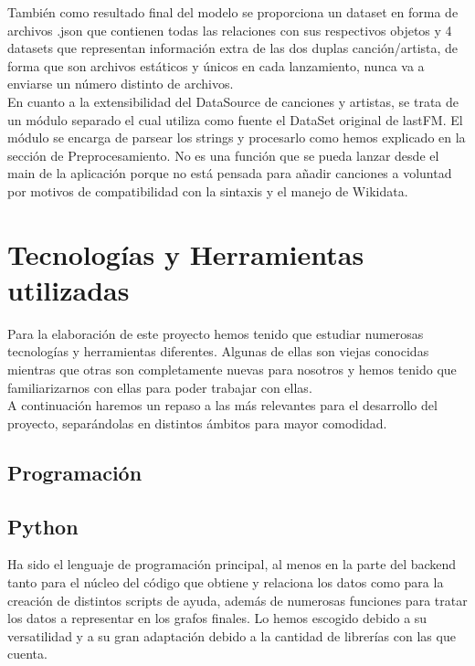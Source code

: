 También como resultado final del modelo se proporciona un dataset en forma de archivos .json que contienen todas las relaciones con sus respectivos objetos y 4 datasets que representan información extra de las dos duplas canción/artista, de forma que son archivos estáticos y únicos en cada lanzamiento, nunca va a enviarse un número distinto de archivos.\\

En cuanto a la extensibilidad del DataSource de canciones y artistas, se trata de un módulo separado el cual utiliza como fuente el DataSet original de lastFM. El módulo se encarga de parsear los strings y procesarlo como hemos explicado en la sección de Preprocesamiento. No es una función que se pueda lanzar desde el main de la aplicación porque no está pensada para añadir canciones a voluntad por motivos de compatibilidad con la sintaxis y el manejo de Wikidata.\\

\section{Tecnologías y Herramientas utilizadas}
\label{sec:tecnologias}

Para la elaboración de este proyecto hemos tenido que estudiar numerosas tecnologías y herramientas diferentes. Algunas de ellas son viejas conocidas mientras que otras son completamente nuevas para nosotros y hemos tenido que familiarizarnos con ellas para poder trabajar con ellas.\\

A continuación haremos un repaso a las más relevantes para el desarrollo del proyecto, separándolas en distintos ámbitos para mayor comodidad.\\

\subsection{Programación}

\subsection*{Python}

Ha sido el lenguaje de programación principal, al menos en la parte del backend tanto para el núcleo del código que obtiene y relaciona los datos como para la creación de distintos scripts de ayuda, además de numerosas funciones para tratar los datos a representar en los grafos finales. Lo hemos escogido debido a su versatilidad y a su gran adaptación debido a la cantidad de librerías con las que cuenta.

